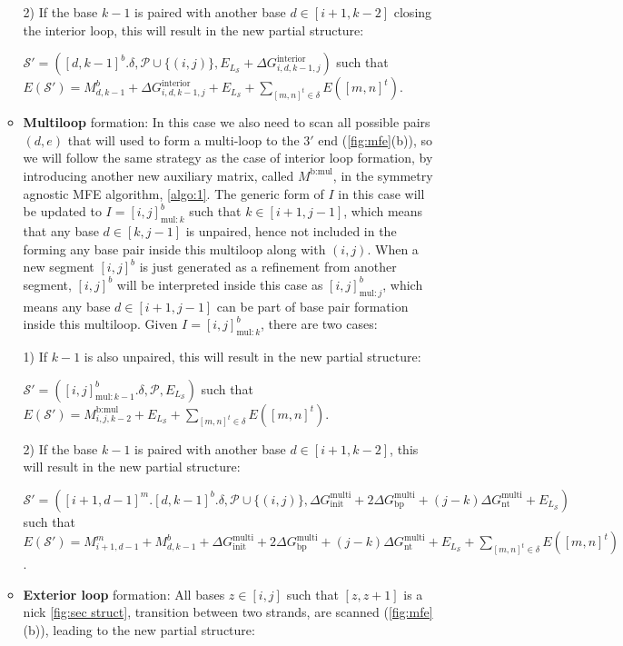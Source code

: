 \documentclass[11pt,letterpaper]{article}  \usepackage[margin=1in]{geometry}
\theoremstyle{definition}  \newtheorem{Definition}[theorem]{Definition}
\begin{document}
\begin{enumerate}
\begin{itemize}
		2) If the base $k-1$ is paired with another base $d \in [i+1,k-2]$ closing the interior loop, this will result in the new partial structure: 
		
		$\mathcal{S}' = ([d,k-1]^b.\delta, \mathcal{P} \cup \{(i,j)\}, E_{L_{\mathcal{S}}} + \Delta G_{i,d,k-1,j}^\text{interior})$ such that $E(\mathcal{S}') = M^b_{d,k-1} + \Delta G_{i,d,k-1,j}^\text{interior}   +E_{L_{\mathcal{S}}} 
		+ \sum \limits_{[m,n]^t \in \delta} E([m,n]^t)$. 
		
		\item \textbf{Multiloop} formation: In this case we also need to scan all possible pairs $(d,e)$ that will used to form a multi-loop to the $3'$ end (\cref{fig:mfe}(b)), so we will follow the same strategy as the case of interior loop formation, by introducing another new auxiliary matrix, called $M^\text{b:mul}$, in the symmetry agnostic MFE algorithm,  \cref{algo:1}. 
		The generic form of $I$ in this case will be updated to $I = [i,j]^b_{\text{mul}:k}$ such that $k \in [i+1,j-1]$, which means that any base $d \in[k,j-1]$ is unpaired, hence not included in the forming any base pair inside this multiloop along with $(i,j)$.
		When a new segment $[i,j]^b$ is just generated as a refinement from another segment, 
		$[i,j]^b$ will be interpreted inside this case as $ [i,j]^b_{\text{mul}:j} $, which means any base $d \in [i+1,j-1]$ can be part of base pair formation inside this multiloop. 
		Given  $I = [i,j]^b_{\text{mul}:k}$, there are two cases:
		
		1) If $k-1$ is also unpaired, this will
		result in the new partial structure: 
		
		
		$\mathcal{S}' = ([i,j]^b_{\text{mul}:k-1}.\delta, \mathcal{P}, E_{L_{\mathcal{S}}})$ such that $E(\mathcal{S}') = M_{i,j,k-2}^\text{b:mul} + E_{L_{\mathcal{S}}} + \sum \limits_{[m,n]^t \in \delta} E([m,n]^t)$. 
		
		2) If the base $k-1$ is paired with another base $d \in [i+1,k-2]$, this will result in the new partial structure: 
		
		$\mathcal{S}' = ([i+1,d-1]^m.[d,k-1]^b.\delta, \mathcal{P} \cup \{(i,j)\}, \Delta G_\text{init}^\text{multi} + 2\Delta G_\text{bp}^\text{multi} + (j-k) \Delta G_\text{nt}^\text{multi} + E_{L_{\mathcal{S}}})$ such that $E(\mathcal{S}') =  M^m_{i+1,d-1} + M^b_{d,k-1} + \Delta G_\text{init}^\text{multi} + 2\Delta G_\text{bp}^\text{multi} + (j-k)\Delta G_\text{nt}^\text{multi} +E_{L_{\mathcal{S}}} 
		+ \sum \limits_{[m,n]^t \in \delta} E([m,n]^t)$. 
		
		\item \textbf{Exterior loop} formation: All bases $z \in [i,j]$ such that $[z,z+1]$ is a nick \cref{fig:sec struct}, transition between two strands, are scanned (\cref{fig:mfe}(b)), leading to the new partial structure: 
		

\end{itemize}
\end{enumerate}
\end{document}
